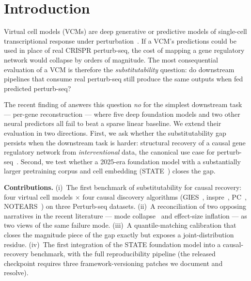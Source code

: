 \documentclass{article}
\begin{document}
\section{Introduction}
\label{sec:intro}
Virtual cell models (VCMs) are deep generative or predictive models of single-cell transcriptional response under perturbation~\citep{lotfollahi2023cpa,roohani2024gears,theodoris2023geneformer,cui2024scgpt,bunne2024,arc2025state}. If a VCM's predictions could be used in place of real CRISPR perturb-seq, the cost of mapping a gene regulatory network would collapse by orders of magnitude. The most consequential evaluation of a VCM is therefore the \emph{substitutability} question: do downstream pipelines that consume real perturb-seq still produce the same outputs when fed predicted perturb-seq?

The recent finding of \citet{ahlmanneltze2025} answers this question \emph{no} for the simplest downstream task --- per-gene reconstruction --- where five deep foundation models and two other neural predictors all fail to beat a sparse linear baseline. We extend their evaluation in two directions. First, we ask whether the substitutability gap persists when the downstream task is harder: structural recovery of a causal gene regulatory network from \emph{interventional} data, the canonical use case for perturb-seq~\citep{chevalley2025causalbench,vc_causal_2025}. Second, we test whether a 2025-era foundation model with a substantially larger pretraining corpus and cell embedding (STATE~\citep{arc2025state}) closes the gap.

\textbf{Contributions.} (i)~The first benchmark of substitutability for causal recovery: four virtual cell models $\times$ four causal discovery algorithms (GIES~\citep{hauser2012gies}, inspre~\citep{brown2025inspre}, PC~\citep{spirtes2000}, NOTEARS~\citep{zheng2018notears}) on three Perturb-seq datasets. (ii)~A reconciliation of two opposing narratives in the recent literature --- mode collapse~\citep{mejia2025diversity} and effect-size inflation --- as two views of the same failure mode. (iii)~A quantile-matching calibration that closes the magnitude piece of the gap exactly but exposes a joint-distribution residue. (iv)~The first integration of the STATE foundation model into a causal-recovery benchmark, with the full reproducibility pipeline (the released checkpoint requires three framework-versioning patches we document and resolve).
\end{document}
